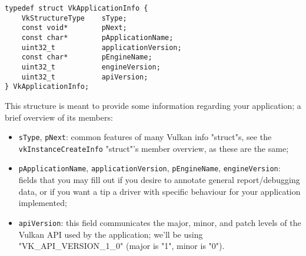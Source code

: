 \documentclass[12pt,letterpaper]{article}
\newcommand{\cil}[1]{\texttt{#1}}
\begin{document}
		\begin{verbatim}
typedef struct VkApplicationInfo {
	VkStructureType    sType;
	const void*        pNext;
	const char*        pApplicationName;
	uint32_t           applicationVersion;
	const char*        pEngineName;
	uint32_t           engineVersion;
	uint32_t           apiVersion;
} VkApplicationInfo;
		\end{verbatim}
	This structure is meant to provide some information regarding your application; a brief overview of its members:
		\begin{itemize}
			\item \cil{sType}, \cil{pNext}: common features of many Vulkan info "struct"s, see the \cil{vkInstanceCreateInfo} "struct"'s member overview, as these are the same;
			
			\item \cil{pApplicationName}, \cil{applicationVersion}, \cil{pEngineName}, \cil{engineVersion}: fields that you may fill out if you desire to annotate general report/debugging data, or if you want a tip a driver with specific behaviour for your application implemented;
			
			\item \cil{apiVersion}:  this field communicates the major, minor, and patch levels of the Vulkan API used by the application; we'll be using "VK\_API\_VERSION\_1\_0" (major is "1", minor is "0").
		\end{itemize}
	
\end{document}
